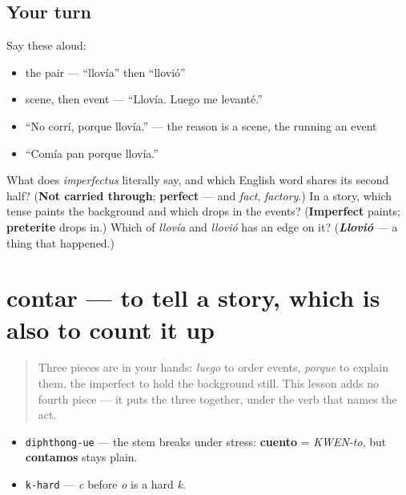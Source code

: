\subsection*{Your turn}
Say these aloud:

\begin{itemize}
\raggedright
  \item the pair — \textquotedblleft{}llovía\textquotedblright{} then \textquotedblleft{}llovió\textquotedblright{}
  \item scene, then event — \textquotedblleft{}Llovía. Luego me levanté.\textquotedblright{}
  \item \textquotedblleft{}No corrí, porque llovía.\textquotedblright{} — the reason is a scene, the running an event
  \item \textquotedblleft{}Comía pan porque llovía.\textquotedblright{}
\end{itemize}

\begin{tcolorbox}[breakable,colback=teal!4,colframe=teal!35!black,title={Before you move on}]
What does \emph{imperfectus} literally say, and which English word shares its second half? (\textbf{Not carried through}; \textbf{perfect} — and \emph{fact}, \emph{factory}.) In a story, which tense paints the background and which drops in the events? (\textbf{Imperfect} paints; \textbf{preterite} drops in.) Which of \emph{llovía} and \emph{llovió} has an edge on it? (\emph{\textbf{Llovió}} — a thing that happened.)
\end{tcolorbox}
\section[contar]{contar — to tell a story, which is also to count it up}

\label{lesson:ES-C38-contar}



\begin{quote}
Three pieces are in your hands: \emph{luego} to order events, \emph{porque} to explain them, the imperfect to hold the background still. This lesson adds no fourth piece — it puts the three together, under the verb that names the act.
\end{quote}

\begin{sounds}
\begin{itemize}
\raggedright
  \item \texttt{diphthong-ue} — the stem breaks under stress: \textbf{cuento} = \emph{KWEN-to}, but \textbf{contamos} stays plain.
  \item \texttt{k-hard} — \emph{c} before \emph{o} is a hard \emph{k}.
\end{itemize}
\end{sounds}

